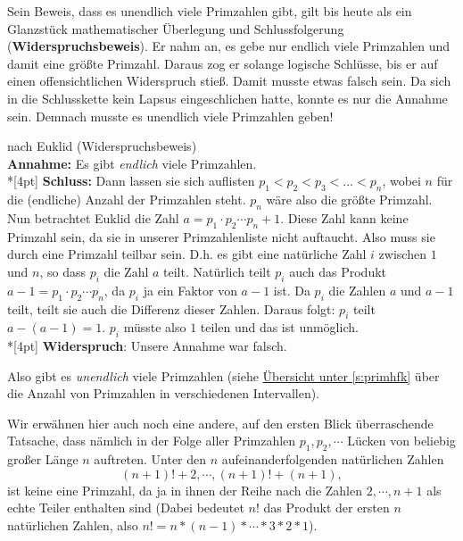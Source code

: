 \begin{refsegment}
Sein Beweis, dass es unendlich viele Primzahlen gibt, gilt bis heute als
ein Glanzstück mathematischer Überlegung und Schlussfolgerung
(\textbf{Widerspruchsbeweis}).
Er nahm an, es gebe nur endlich viele Primzahlen und damit eine größte
Primzahl. Daraus zog er solange logische Schlüsse, bis er auf einen
offensichtlichen Widerspruch stieß. Damit musste etwas falsch sein. Da
sich in die Schlusskette kein Lapsus eingeschlichen hatte, konnte es nur
die Annahme sein. Demnach musste es unendlich viele Primzahlen geben!\\

\hypertarget{ht_euclid}{}
\begin{Beweis}{nach Euklid (Widerspruchsbeweis)\\}
\textbf{Annahme:} \quad Es gibt {\em endlich} viele Primzahlen.
\\*[4pt] \textbf{Schluss:} \quad Dann lassen sie sich auflisten $p_1
< p_2 < p_3 < \dots < p_n$, wobei $n$ für die (endliche) Anzahl
der Primzahlen steht. $p_n$ wäre also die größte Primzahl. Nun
betrachtet Euklid die Zahl $a = p_1 \cdot p_2 \cdots p_n +1$.
Diese Zahl kann keine Primzahl sein, da sie in unserer
Primzahlenliste nicht auftaucht. Also muss sie durch eine Primzahl
teilbar sein. D.h. es gibt eine natürliche Zahl $i$ zwischen $1$
und $n$, so dass $p_i$ die Zahl $a$ teilt. Natürlich teilt $p_i$
auch das Produkt $a-1 = p_1 \cdot p_2 \cdots p_n$, da $p_i$ ja ein
Faktor von $a-1$ ist. Da $ p_i $ die Zahlen $ a $ und $ a-1 $
teilt, teilt sie auch die Differenz dieser Zahlen. Daraus folgt:
$p_i$ teilt  $a - (a-1) = 1$. $p_i$ müsste also $1$ teilen und
das ist unmöglich.\\*[4pt]
\textbf{Widerspruch}: \quad Unsere Annahme war falsch.\par

Also gibt es {\em unendlich} viele Primzahlen
(siehe \hyperlink{primhfk}{Übersicht unter \ref{s:primhfk}} über die
Anzahl von Primzahlen in verschiedenen Intervallen).
\end{Beweis}


Wir erwähnen hier auch noch eine andere, auf den ersten Blick
überraschende Tatsache, dass nämlich in der Folge aller
Primzahlen $p_1, p_2, \cdots $ Lücken von beliebig großer
Länge $n$ auftreten. Unter den $n$ aufeinanderfolgenden
natürlichen Zahlen
$$
    (n+1)!+2, \cdots, (n+1)!+(n+1),
$$
ist keine eine Primzahl, da ja in ihnen der Reihe nach die
Zahlen $2,\cdots, n+1$ als echte Teiler enthalten sind
(Dabei bedeutet $n!$ das Produkt der ersten $n$ natürlichen
Zahlen, also $n!=n*(n-1)* \cdots *3*2*1$).



\end{refsegment}
